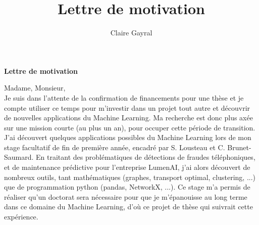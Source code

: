 \documentclass[a4paper,11pt]{article}
\title{Lettre de motivation}
\author{Claire Gayral}
\date{}
\begin{document}
{\centering \Large \bf Lettre de motivation \\ \vspace{0.6cm} }

Madame, Monsieur, 
\\


Je suis dans l'attente de la confirmation de financements pour une thèse %
et je compte utiliser ce temps pour m'investir dans un projet tout autre et découvrir de nouvelles applications du Machine Learning.  %
Ma recherche est donc plus axée sur une mission courte (au plus un an), pour occuper cette période de transition. %
J'ai découvert quelques applications possibles du Machine Learning lors de mon stage facultatif de fin de première année, encadré par S. Lousteau et C. Brunet-Saumard.
En traitant des problématiques de détections de fraudes téléphoniques, et de maintenance prédictive pour l'entreprise LumenAI, j'ai alors découvert de nombreux outils, tant mathématiques (graphes, transport optimal, clustering, ...) que de programmation python (pandas, NetworkX, ...). 
Ce stage m'a permis de réaliser qu'un doctorat sera nécessaire pour que je m'épanouisse au long terme dans ce domaine du Machine Learning, 
%
d'où ce projet de thèse qui suivrait cette expérience. 

\end{document}
